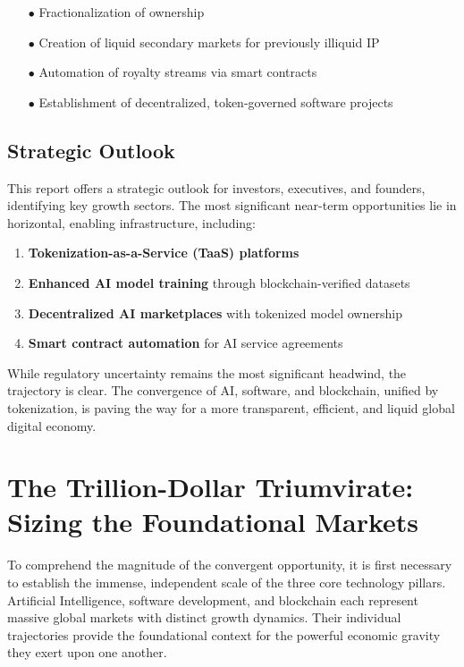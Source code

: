 \documentclass[11pt,a4paper]{report}
\begin{document}
\begin{itemize}[leftmargin=2cm]
    \item[$\bullet$] Fractionalization of ownership
    \item[$\bullet$] Creation of liquid secondary markets for previously illiquid IP
    \item[$\bullet$] Automation of royalty streams via smart contracts
    \item[$\bullet$] Establishment of decentralized, token-governed software projects
\end{itemize}

\section*{Strategic Outlook}

This report offers a strategic outlook for investors, executives, and founders, identifying key growth sectors. The most significant near-term opportunities lie in horizontal, enabling infrastructure, including:

\begin{enumerate}
    \item \textbf{Tokenization-as-a-Service (TaaS) platforms}
    \item \textbf{Enhanced AI model training} through blockchain-verified datasets
    \item \textbf{Decentralized AI marketplaces} with tokenized model ownership
    \item \textbf{Smart contract automation} for AI service agreements
\end{enumerate}

While regulatory uncertainty remains the most significant headwind, the trajectory is clear. The convergence of AI, software, and blockchain, unified by tokenization, is paving the way for a more transparent, efficient, and liquid global digital economy.
\chapter{The Trillion-Dollar Triumvirate: Sizing the Foundational Markets}

To comprehend the magnitude of the convergent opportunity, it is first necessary to establish the immense, independent scale of the three core technology pillars. Artificial Intelligence, software development, and blockchain each represent massive global markets with distinct growth dynamics. Their individual trajectories provide the foundational context for the powerful economic gravity they exert upon one another.
\end{document}
